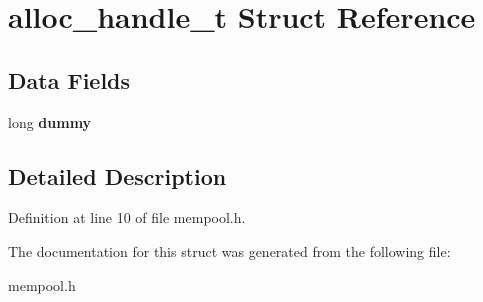 \hypertarget{structalloc__handle__t}{}\section{alloc\+\_\+handle\+\_\+t Struct Reference}
\label{structalloc__handle__t}
\subsection*{Data Fields}
\begin{DoxyCompactItemize}
\item 
\mbox{\label{structalloc__handle__t_a99ab6fb123eb2d686f760c9230c2af84}} 
long {\bfseries dummy}
\end{DoxyCompactItemize}


\subsection{Detailed Description}


Definition at line 10 of file mempool.\+h.



The documentation for this struct was generated from the following file\+:\begin{DoxyCompactItemize}
\item 
mempool.\+h\end{DoxyCompactItemize}
